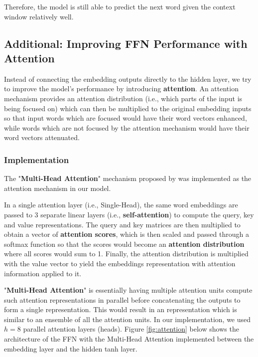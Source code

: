 \documentclass[sigconf,nonacm=true]{acmart}
\begin{document}
Therefore, the model is still able to predict the next word given the context window relatively well.


\subsection{Additional: Improving FFN Performance with Attention}
Instead of connecting the embedding outputs directly to the hidden layer, we try to improve the model's performance by introducing \textbf{attention}. An attention mechanism provides an attention distribution (i.e., which parts of the input is being focused on) which can then be multiplied to the original embedding inputs so that input words which are focused would have their word vectors enhanced, while words which are not focused by the attention mechanism would have their word vectors attenuated.

\subsubsection{Implementation}
The "\textbf{Multi-Head Attention}" mechanism proposed by \citeauthor{NIPS2017_3f5ee243} \cite{NIPS2017_3f5ee243} was implemented as the attention mechanism in our model. 

In a single attention layer (i.e., Single-Head), the same word embeddings are passed to 3 separate linear layers (i.e., \textbf{self-attention}) to compute the query, key and value representations. The query and key matrices are then multiplied to obtain a vector of \textbf{attention scores}, which is then scaled and passed through a softmax function so that the scores would become an \textbf{attention distribution} where all scores would sum to 1. Finally, the attention distribution is multiplied with the value vector to yield the embeddings representation with attention information applied to it.

"\textbf{Multi-Head Attention}" is essentially having multiple attention units compute such attention representations in parallel before concatenating the outputs to form a single representation. This would result in an representation which is similar to an ensemble of all the attention units. In our implementation, we used $ h = 8 $ parallel attention layers (heads). Figure \ref{fig:attention} below shows the architecture of the FFN with the Multi-Head Attention implemented between the embedding layer and the hidden tanh layer.
\end{document}
